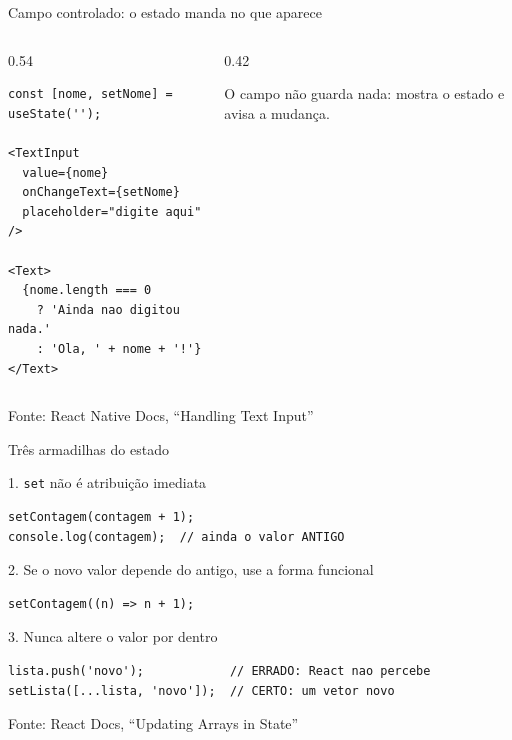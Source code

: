 \documentclass[aspectratio=169]{beamer}
\newcommand{\fonte}[1]{\vfill\hfill{\scriptsize\textcolor{UFSGray}{Fonte: #1}}}
\begin{document}
\begin{frame}[fragile]{Campo controlado: o estado manda no que aparece}
  \begin{columns}[T]
    \begin{column}{0.54\textwidth}
\begin{lstlisting}[style=jsx]
const [nome, setNome] = useState('');

<TextInput
  value={nome}
  onChangeText={setNome}
  placeholder="digite aqui"
/>

<Text>
  {nome.length === 0
    ? 'Ainda nao digitou nada.'
    : 'Ola, ' + nome + '!'}
</Text>
\end{lstlisting}
    \end{column}
    \begin{column}{0.42\textwidth}
      \begin{center}
      \end{center}
      \small O campo não guarda nada: mostra o estado e avisa a mudança.
    \end{column}
  \end{columns}
  \fonte{React Native Docs, ``Handling Text Input''~\cite{reactnative2025docs}}
\end{frame}

\begin{frame}[fragile]{Três armadilhas do estado}
  \begin{block}{1. \texttt{set} não é atribuição imediata}
\begin{lstlisting}[style=jsx]
setContagem(contagem + 1);
console.log(contagem);  // ainda o valor ANTIGO
\end{lstlisting}
  \end{block}
  \begin{block}{2. Se o novo valor depende do antigo, use a forma funcional}
\begin{lstlisting}[style=jsx]
setContagem((n) => n + 1);
\end{lstlisting}
  \end{block}
  \begin{block}{3. Nunca altere o valor por dentro}
\begin{lstlisting}[style=jsx]
lista.push('novo');            // ERRADO: React nao percebe
setLista([...lista, 'novo']);  // CERTO: um vetor novo
\end{lstlisting}
  \end{block}
  \fonte{React Docs, ``Updating Arrays in State''~\cite{react2025docs}}
\end{frame}
\end{document}

